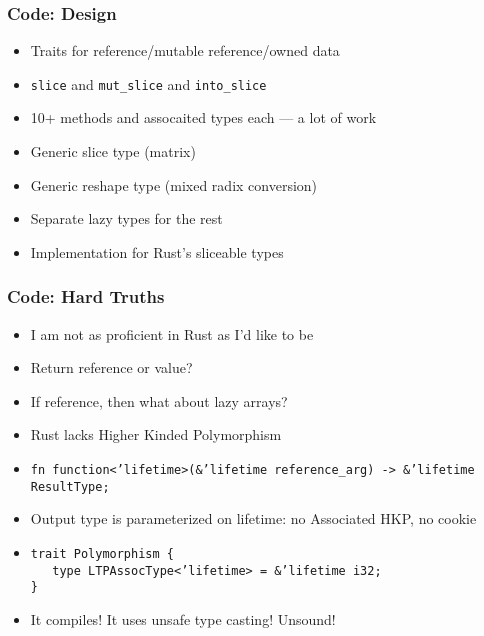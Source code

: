 \documentclass[xetex,mathserif,serif]{beamer}
\begin{document}
\begin{frame}
  \frametitle{Code: Design}
  \begin{itemize}%
    \item Traits for reference/mutable reference/owned data
    \item \texttt{slice} and \texttt{mut\_slice} and \texttt{into\_slice}
    \item 10+ methods and assocaited types each --- a lot of work
    \item Generic slice type (matrix)
    \item Generic reshape type (mixed radix conversion)
    \item Separate lazy types for the rest
    \item Implementation for Rust's sliceable types
  \end{itemize}
\end{frame}

\begin{frame}
  \frametitle{Code: Hard Truths}
  \begin{itemize}%
    \item I am not as proficient in Rust as I'd like to be
    \item Return reference or value?
    \item If reference, then what about lazy arrays?
    \item Rust lacks Higher Kinded Polymorphism
    \item \texttt{fn function<'lifetime>(\&'lifetime reference\_arg) -> \&'lifetime ResultType;}
    \item Output type is parameterized on lifetime: no Associated HKP, no cookie
    \item \texttt{trait Polymorphism \{\\
            \ \ \ type LTPAssocType<'lifetime> = \&'lifetime i32;\\
                  \}}
    \item It compiles! It uses unsafe type casting! Unsound!
  \end{itemize}
\end{frame}
\end{document}
